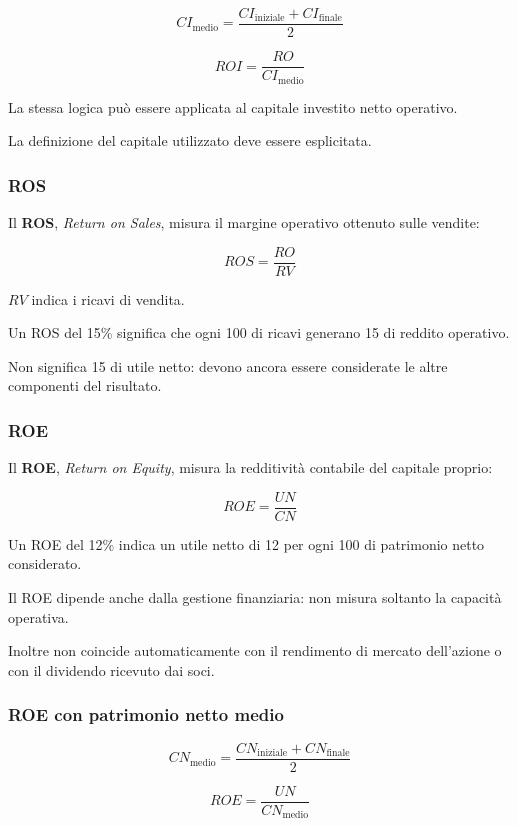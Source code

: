 \[
\boxed{
CI_{\text{medio}}
=
\frac{CI_{\text{iniziale}}+CI_{\text{finale}}}{2}
}
\]

\[
\boxed{
ROI=\frac{RO}{CI_{\text{medio}}}
}
\]

\noindent La stessa logica
può essere applicata
al capitale investito netto operativo.

\noindent La definizione del capitale utilizzato
deve essere esplicitata.


\subsubsection*{ROS}

\noindent Il \textbf{ROS},
\textit{Return on Sales},
misura il margine operativo
ottenuto sulle vendite:

\[
\boxed{
ROS=\frac{RO}{RV}
}
\]

\noindent $RV$ indica
i ricavi di vendita.

\noindent Un ROS del 15\%
significa che ogni 100 di ricavi
generano 15 di reddito operativo.

\noindent Non significa
15 di utile netto:
devono ancora essere considerate
le altre componenti del risultato.


\subsubsection*{ROE}

\noindent Il \textbf{ROE},
\textit{Return on Equity},
misura la redditività contabile
del capitale proprio:

\[
\boxed{
ROE=\frac{UN}{CN}
}
\]

\noindent Un ROE del 12\%
indica un utile netto di 12
per ogni 100 di patrimonio netto
considerato.

\noindent Il ROE dipende anche
dalla gestione finanziaria:
non misura soltanto
la capacità operativa.

\noindent Inoltre non coincide
automaticamente con il rendimento
di mercato dell'azione
o con il dividendo ricevuto dai soci.


\subsubsection*{ROE con patrimonio netto medio}

\[
\boxed{
CN_{\text{medio}}
=
\frac{CN_{\text{iniziale}}+CN_{\text{finale}}}{2}
}
\]

\[
\boxed{
ROE=\frac{UN}{CN_{\text{medio}}}
}
\]

